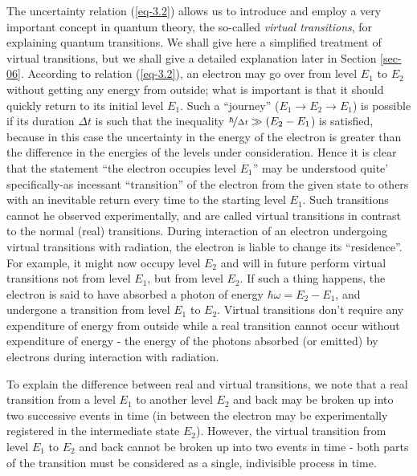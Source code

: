 \documentclass[a4paper,sfsidenotes,colorlinks=true]{tufte-book}
\numberwithin{equation}{section}
\numberwithin{figure}{section}
\begin{document}
\begin{fullwidth}
  \setlength{\leftskip}{3cm} \textsf{\small The uncertainty relation
    (\ref{eq-3.2}) allows us to introduce and employ a very important
    concept in quantum theory, the so-called \emph{virtual
      transitions}, for explaining quantum transitions. We shall give
    here a simplified treatment of virtual transitions, but we shall
    give a detailed explanation later in Section
    \ref{sec-06}. According to relation (\ref{eq-3.2}), an electron
    may go over from level $E_{1}$ to $E_{2}$ without getting any
    energy from outside; what is important is that it should quickly
    return to its initial level $E_{1}$. Such a ``journey'' ($E_{1}
    \to E_{2} \to E_{1}$) is possible if its duration $\Delta t$ is
    such that the inequality $\nicefrac{\hbar}{\Delta t} \gg (E_{2} -
    E_{1}$) is satisfied, because in this case the uncertainty in the
    energy of the electron is greater than the difference in the
    energies of the levels under consideration. Hence it is clear that
    the statement ``the electron occupies level $E_{1}$'' may be
    understood quite' specifically-as incessant ``transition'' of the
    electron from the given state to others with an inevitable return
    every time to the starting level $E_{1}$. Such transitions cannot
    he observed experimentally, and are called virtual transitions in
    contrast to the normal (real) transitions. During interaction of
    an electron undergoing virtual transitions with radiation, the
    electron is liable to change its ``residence''. For example, it
    might now occupy level $E_{2}$ and will in future perform virtual
    transitions not from level $E_{1}$, but from level $E_{2}$. If
    such a thing happens, the electron is said to have absorbed a
    photon of energy $\hbar \omega = E_{2} - E_{1}$, and undergone a
    transition from level $E_{1}$ to $E_{2}$. Virtual transitions
    don't require any expenditure of energy from outside while a real
    transition cannot occur without expenditure of energy - the energy
    of the photons absorbed (or emitted) by electrons during
    interaction with radiation.}

    \textsf{\small To explain the difference between real and virtual transitions,
    we note that a real transition from a level $E_{1}$ to another level
    $E_{2}$ and back may be broken up into two successive events in time
    (in between the electron may be experimentally registered in the
    intermediate state $E_{2}$). However, the virtual transition from
    level $E_{1}$ to $E_{2}$ and back cannot be broken up into two events in
    time - both parts of the transition must be considered as a single,
    indivisible process in time.}
\end{fullwidth}
\vspace{5pt}
\setlength{\leftskip}{0pt}
\end{document}

